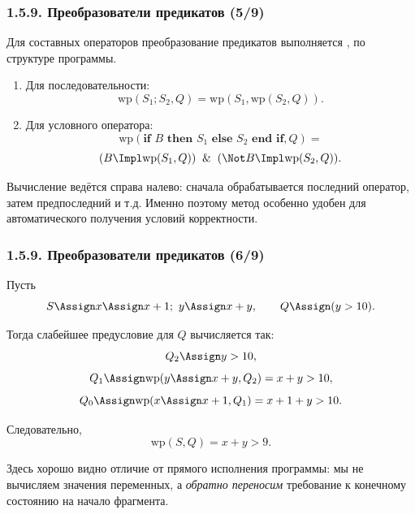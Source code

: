 \begin{frame}
\frametitle{1.5.9. Преобразователи предикатов (5/9)}

Для составных операторов преобразование предикатов выполняется
,
по структуре программы.

\begin{enumerate}
\item Для последовательности:
\[
\mathrm{wp}(S_1;S_2,Q)=\mathrm{wp}(S_1,\mathrm{wp}(S_2,Q)).
\]

\item Для условного оператора:
\[
\mathrm{wp}(\textbf{if } B \textbf{ then } S_1 \textbf{ else } S_2 \textbf{ end if},Q)=
\]
\[
(B \Impl \mathrm{wp}(S_1,Q)) \And (\Not B \Impl \mathrm{wp}(S_2,Q)).
\]
\end{enumerate}

\begin{remark}
Вычисление ведётся справа налево:
сначала обрабатывается последний оператор,
затем предпоследний и т.д.
Именно поэтому метод особенно удобен для автоматического
получения условий корректности.
\end{remark}

\end{frame}

\begin{frame}
\frametitle{1.5.9. Преобразователи предикатов (6/9)}

\begin{example}
Пусть
\[
S \Assign x \Assign x+1;\ y \Assign x+y,
\qquad
Q \Assign (y>10).
\]

Тогда слабейшее предусловие для $Q$ вычисляется так:
\[
Q_2 \Assign y>10,
\]
\[
Q_1 \Assign \mathrm{wp}(y \Assign x+y,Q_2)=x+y>10,
\]
\[
Q_0 \Assign \mathrm{wp}(x \Assign x+1,Q_1)=x+1+y>10.
\]

Следовательно,
\[
\mathrm{wp}(S,Q)=x+y>9.
\]
\end{example}

\begin{remark}
Здесь хорошо видно отличие от прямого исполнения программы:
мы не вычисляем значения переменных,
а \emph{обратно переносим} требование к конечному состоянию
на начало фрагмента.
\end{remark}

\end{frame}

